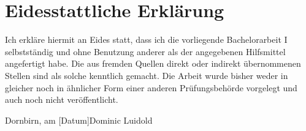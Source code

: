 \documentclass[a4paper,12pt,twoside]{scrreprt}
\begin{document}
\chapter*{Eidesstattliche Erklärung}
Ich erkläre hiermit an Eides statt, dass ich die vorliegende Bachelorarbeit I selbstständig und ohne Benutzung anderer als der angegebenen Hilfsmittel angefertigt habe. Die aus fremden Quellen direkt oder indirekt übernommenen Stellen sind als solche kenntlich gemacht. Die Arbeit wurde bisher weder in gleicher noch in ähnlicher Form einer anderen Prüfungsbehörde vorgelegt und auch noch nicht veröffentlicht.

\vspace{3cm}
\noindent
Dornbirn, am [Datum]\hfill Dominic Luidold
\end{document}
